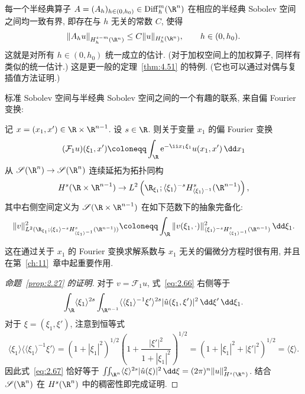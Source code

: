 每一个半经典算子 $A = (A_h)_{h \in (0, h_0)} \in \Diff_\hbar^m(\R^n)$ 在相应的半经典 Sobolev 空间之间均一致有界, 即存在与 $h$ 无关的常数 $C$, 使得
\begin{equation}\label{eq:2.63}
    \|A_h u\|_{H_h^{s-m}(\R^n)} \le C \|u\|_{H_h^s(\R^n)}, \qquad h \in (0, h_0).
\end{equation}
这就是对所有 $h \in (0, h_0)$ 统一成立的估计. (对于加权空间上的加权算子, 同样有类似的统一估计.) 这是更一般的定理~\ref{thm:4.51} 的特例. (它也可以通过对偶与复插值方法证明.)

标准 Sobolev 空间与半经典 Sobolev 空间之间的一个有趣的联系, 来自偏 Fourier 变换:

\begin{proposition}\label{prop:2.27}
记 $x = (x_1, x') \in \R \times \R^{n-1}$. 设 $s \in \R$. 则关于变量 $x_1$ 的偏 Fourier 变换
\begin{equation}\label{eq:2.64}
    (\mathcal{F}_1 u)(\xi_1, x') \defeq \int_\R \ee^{-\ii x_1 \xi_1} u(x_1, x') \,\dd x_1
\end{equation}
从 $\Schwartz(\R^n) \to \Schwartz(\R^n)$ 连续延拓为拓扑同构
\begin{equation}\label{eq:2.65}
    H^s(\R \times \R^{n-1}) \to L^2\left( \R_{\xi_1}; \langle \xi_1 \rangle^{-s} H_{\langle \xi_1 \rangle^{-1}}^s(\R^{n-1}) \right),
\end{equation}
其中右侧空间定义为 $\Schwartz(\R \times \R^{n-1})$ 在如下范数下的抽象完备化:
\begin{equation}\label{eq:2.66}
    \|v\|_{L^2(\R_{\xi_1}; \langle \xi_1 \rangle^{-s} H_{\langle \xi_1 \rangle^{-1}}^s(\R^{n-1}))}^2 \defeq \int_\R \|v(\xi_1, \cdot)\|_{\langle \xi_1 \rangle^{-s} H_{\langle \xi_1 \rangle^{-1}}^s(\R^{n-1})}^2 \,\dd\xi_1.
\end{equation}
\end{proposition}

这在通过关于 $x_1$ 的 Fourier 变换求解系数与 $x_1$ 无关的偏微分方程时很有用, 并且在第~\ref{ch:11}~章中起重要作用.

\begin{proof}[命题~\ref{prop:2.27} 的证明]
对于 $v = \mathcal{F}_1 u$, 式~\eqref{eq:2.66} 右侧等于
\begin{equation}\label{eq:2.67}
    \int_\R \langle \xi_1 \rangle^{2s} \int_{\R^{n-1}} \langle \langle \xi_1 \rangle^{-1} \xi' \rangle^{2s} |\hat{u}(\xi_1, \xi')|^2 \,\dd\xi' \,\dd\xi_1.
\end{equation}
对于 $\xi = (\xi_1, \xi')$, 注意到恒等式
\[
    \langle \xi_1 \rangle \langle \langle \xi_1 \rangle^{-1} \xi' \rangle = \left( 1 + |\xi_1|^2 \right)^{1/2} \left( 1 + \frac{|\xi'|^2}{1 + |\xi_1|^2} \right)^{1/2} = \left( 1 + |\xi_1|^2 + |\xi'|^2 \right)^{1/2} = \langle \xi \rangle.
\]
因此式~\eqref{eq:2.67} 恰好等于 $\iint_{\R^n} \langle \xi \rangle^{2s} |\hat{u}(\xi)|^2 \,\dd\xi = (2\pi)^n \|u\|_{H^s(\R^n)}^2$. 结合 $\Schwartz(\R^n)$ 在 $H^s(\R^n)$ 中的稠密性即完成证明.
\end{proof}

